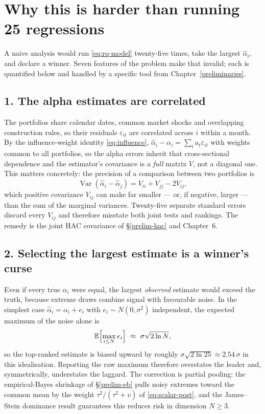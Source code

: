 \section{Why this is harder than running 25 regressions}\label{rq-difficulties}

A naive analysis would run \eqref{eq:rq-model} twenty-five times, take the
largest $\hat\alpha_i$, and declare a winner. Seven features of the problem
make that invalid; each is quantified below and handled by a specific tool
from Chapter~\ref{preliminaries}.

\subsection{1. The alpha estimates are correlated}

The portfolios share calendar dates, common market shocks and overlapping
construction rules, so their residuals $\varepsilon_{it}$ are correlated
across $i$ within a month. By the influence-weight identity
\eqref{eq:influence}, $\hat\alpha_i-\alpha_i=\sum_t a_t\varepsilon_{it}$
with weights common to all portfolios, so the alpha errors inherit that
cross-sectional dependence and the estimator's covariance is a
\emph{full} matrix $V$, not a diagonal one. This matters concretely: the
precision of a comparison between two portfolios is
\begin{equation}
\operatorname{Var}(\hat\alpha_i-\hat\alpha_j)=V_{ii}+V_{jj}-2V_{ij},
\end{equation}
which positive covariance $V_{ij}$ can make far smaller --- or, if
negative, larger --- than the sum of the marginal variances. Twenty-five
separate standard errors discard every $V_{ij}$ and therefore misstate
both joint tests and rankings. The remedy is the joint HAC covariance of
\S\ref{prelim-hac} and Chapter~6.

\subsection{2. Selecting the largest estimate is a winner's curse}

Even if every true $\alpha_i$ were equal, the largest \emph{observed}
estimate would exceed the truth, because extreme draws combine signal with
favourable noise. In the simplest case $\hat\alpha_i=\alpha_i+e_i$ with
$e_i\sim N(0,\sigma^2)$ independent, the expected maximum of the noise
alone is
\begin{equation}
\mathbb{E}\Bigl[\max_{i\le N} e_i\Bigr]\ \approx\ \sigma\sqrt{2\ln N},
\end{equation}
so the top-ranked estimate is biased upward by roughly
$\sigma\sqrt{2\ln 25}\approx 2.54\,\sigma$ in this idealisation. Reporting
the raw maximum therefore overstates the leader and, symmetrically,
understates the laggard. The correction is partial pooling: the
empirical-Bayes shrinkage of \S\ref{prelim-eb} pulls noisy extremes toward
the common mean by the weight $\tau^2/(\tau^2+v)$ of
\eqref{eq:scalar-post}, and the James--Stein dominance result guarantees
this reduces risk in dimension $N\ge 3$.

